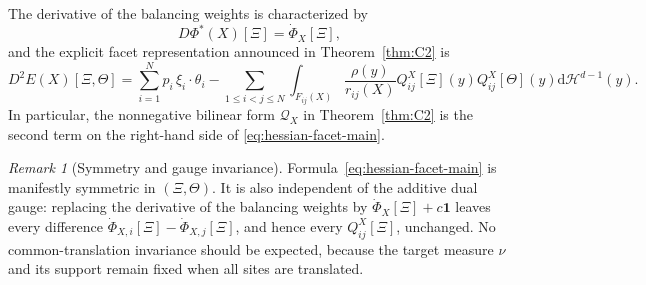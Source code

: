 \documentclass[11pt]{article}
\newcommand{\dd}{\mathrm{d}}
\newcommand{\HH}{\mathcal H}
\newcommand{\one}{\mathbf 1}
\theoremstyle{definition}
\theoremstyle{remark}
\newtheorem{remark}[theorem]{Remark}
\numberwithin{equation}{section}
\begin{document}
The derivative of the balancing weights is characterized by
\begin{equation}\label{eq:Dphi-C2-theorem-main}
 D\Phi^*(X)[\Xi]=\dot\Phi_X[\Xi],
\end{equation}
and the explicit facet representation announced in Theorem~\ref{thm:C2} is
\begin{equation}\label{eq:hessian-facet-main}
 D^2E(X)[\Xi,\Theta]
 =\sum_{i=1}^Np_i\,\xi_i\cdot\theta_i
 -\sum_{1\le i<j\le N}
 \int_{F_{ij}(X)}\frac{\rho(y)}{r_{ij}(X)}
 Q_{ij}^X[\Xi](y)Q_{ij}^X[\Theta](y)
 \dd\HH^{d-1}(y).
\end{equation}
In particular, the nonnegative bilinear form $\mathcal Q_X$ in
Theorem~\ref{thm:C2} is the second term on the right-hand side of
\eqref{eq:hessian-facet-main}.

\begin{remark}[Symmetry and gauge invariance]\label{rem:hessian-invariances}
Formula~\eqref{eq:hessian-facet-main} is manifestly symmetric in $(\Xi,\Theta)$.  It is also
independent of the additive dual gauge: replacing the derivative of the balancing weights by
$\dot\Phi_X[\Xi]+c\one$ leaves every difference
$\dot\Phi_{X,i}[\Xi]-\dot\Phi_{X,j}[\Xi]$, and hence every $Q_{ij}^X[\Xi]$, unchanged.  No
common-translation invariance should be expected, because the target measure $\nu$ and its support
remain fixed when all sites are translated.
\end{remark}
\end{document}
